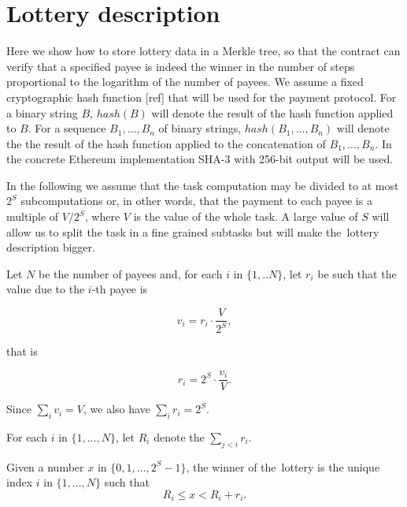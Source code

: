 \documentclass[a4paper]{article}
\begin{document}
\section{Lottery description}
\label{sec:lottery-description}
    Here we show how to store lottery data in a Merkle tree, so that the contract can verify that a specified payee
    is indeed the winner in the number of steps proportional to the logarithm of the number of payees.
    We assume a fixed cryptographic hash function [ref] that will be used for the payment protocol.
    For a binary string $B$, $hash(B)$ will denote the result of the hash function applied to $B$.
    For a sequence $B_1, ..., B_n$ of binary strings, $hash(B_1, ..., B_n)$ will denote the the result of
    the hash function applied to the concatenation of $B_1, ..., B_n$. In the concrete Ethereum implementation SHA-3
    with 256-bit output will be used.

    In the following we assume that the task computation may be divided to at most $2^S$ subcomputations or,
    in other words, that the payment to each payee is a multiple of $V/2^S$, where $V$ is the value of the whole task.
    A large value of $S$ will allow us to split the task in a fine grained subtasks but will make the~lottery
    description bigger.

    Let $N$ be the number of payees and, for each $i$ in $\{1, .. N\}$, let $r_i$ be such that the value due to
    the $i$-th payee is

    \begin{displaymath}
        v_i = r_i \cdot \frac{V}{2^S},
    \end{displaymath}

    that is

    \begin{displaymath}
        r_i = 2^S \cdot \frac{v_i}{V}.
    \end{displaymath}

    Since $\sum_i v_i = V$, we also have $\sum_i r_i = 2^S$.

    For each $i$ in $\{1, ..., N\}$, let $R_i$ denote the $\sum_{j<i} r_i$.

    Given a number $x$ in $\{0, 1 ,... ,2^S-1\}$, the winner of the~lottery is the unique index $i$ in $\{1, ..., N\}$
    such that
    \begin{displaymath}
        R_i \leq x < R_i+r_i.
    \end{displaymath}
\end{document}
